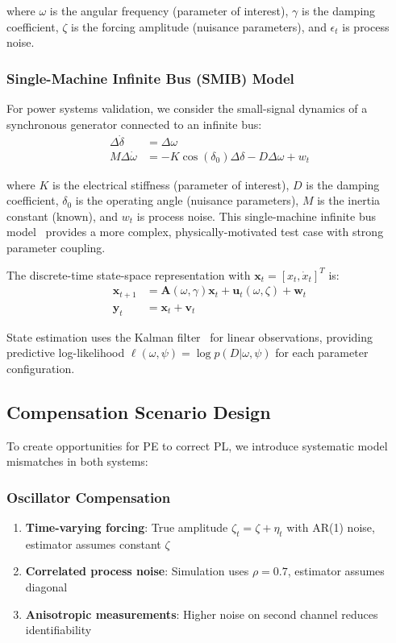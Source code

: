 \documentclass[conference]{IEEEtran}
\begin{document}
where $\omega$ is the angular frequency (parameter of interest), $\gamma$ is the damping coefficient, $\zeta$ is the forcing amplitude (nuisance parameters), and $\epsilon_t$ is process noise.

\subsubsection{Single-Machine Infinite Bus (SMIB) Model}

For power systems validation, we consider the small-signal dynamics of a synchronous generator connected to an infinite bus:
\begin{align}
\Delta\dot{\delta} &= \Delta\omega \\
M\Delta\dot{\omega} &= -K\cos(\delta_0)\Delta\delta - D\Delta\omega + w_t
\end{align}

where $K$ is the electrical stiffness (parameter of interest), $D$ is the damping coefficient, $\delta_0$ is the operating angle (nuisance parameters), $M$ is the inertia constant (known), and $w_t$ is process noise. This single-machine infinite bus model~\cite{kundur1994,sauer2017} provides a more complex, physically-motivated test case with strong parameter coupling.

The discrete-time state-space representation with $\mathbf{x}_t = [x_t, \dot{x}_t]^T$ is:
\begin{align}
\mathbf{x}_{t+1} &= \mathbf{A}(\omega, \gamma) \mathbf{x}_t + \mathbf{u}_t(\omega, \zeta) + \mathbf{w}_t \\
\mathbf{y}_t &= \mathbf{x}_t + \mathbf{v}_t
\end{align}

State estimation uses the Kalman filter~\cite{kalman1960} for linear observations, providing predictive log-likelihood $\ell(\omega, \psi) = \log p(D|\omega, \psi)$ for each parameter configuration.

\subsection{Compensation Scenario Design}

To create opportunities for PE to correct PL, we introduce systematic model mismatches in both systems:

\subsubsection{Oscillator Compensation}
\begin{enumerate}
\item \textbf{Time-varying forcing}: True amplitude $\zeta_t = \zeta + \eta_t$ with AR(1) noise, estimator assumes constant $\zeta$
\item \textbf{Correlated process noise}: Simulation uses $\rho = 0.7$, estimator assumes diagonal
\item \textbf{Anisotropic measurements}: Higher noise on second channel reduces identifiability
\end{enumerate}
\end{document}
